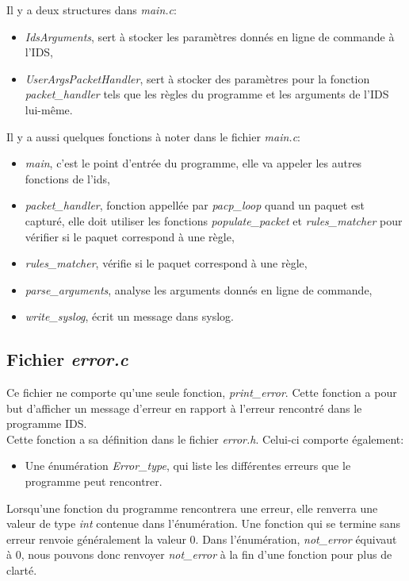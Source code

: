 \documentclass[a4paper]{article}
\begin{document}
Il y a deux structures dans \textit{main.c}:
\begin{itemize}
    \item \textit{IdsArguments}, sert à stocker les paramètres donnés en ligne de commande à l'IDS,
    \item \textit{UserArgsPacketHandler}, sert à stocker des paramètres pour la fonction \textit{packet\_handler} tels que les règles du programme et les arguments de l'IDS lui-même.
\end{itemize}
Il y a aussi quelques fonctions à noter dans le fichier \textit{main.c}:
\begin{itemize}
    \item \textit{main}, c'est le point d'entrée du programme, elle va appeler les autres fonctions de l'ids,
    \item \textit{packet\_handler}, fonction appellée par \textit{pacp\_loop} quand un paquet est capturé, elle doit utiliser les fonctions \textit{populate\_packet} et \textit{rules\_matcher} pour vérifier si le paquet correspond à une règle,
    \item \textit{rules\_matcher}, vérifie si le paquet correspond à une règle,
    \item \textit{parse\_arguments}, analyse les arguments donnés en ligne de commande,
    \item \textit{write\_syslog}, écrit un message dans syslog.
\end{itemize}





\subsection{Fichier \textit{error.c}}



Ce fichier ne comporte qu’une seule fonction, \textit{print\_error}. Cette fonction a pour but d’afficher un message d’erreur en rapport à l’erreur rencontré dans le programme IDS. \\
Cette fonction a sa définition dans le fichier \textit{error.h}. Celui-ci comporte également:
\begin{itemize}
    \item Une énumération \textit{Error\_type}, qui liste les différentes erreurs que le programme peut rencontrer.
\end{itemize}
Lorsqu’une fonction du programme rencontrera une erreur, elle renverra une valeur de type \textit{int} contenue dans l’énumération. Une fonction qui se termine sans erreur renvoie généralement la valeur 0. Dans l’énumération, \textit{not\_error} équivaut à 0, nous pouvons donc renvoyer \textit{not\_error} à la fin d’une fonction pour plus de clarté.
\end{document}

